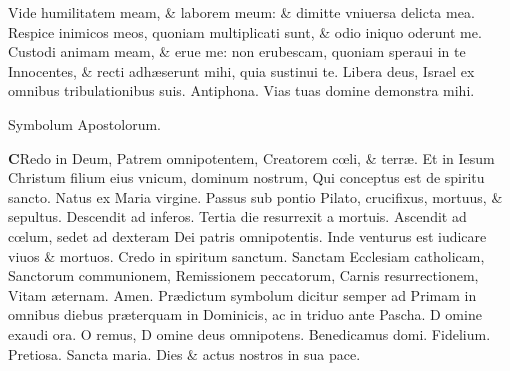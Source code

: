 \documentclass[a5paper,10pt]{book}
\def\ae{æ}
\def\oe{œ}
\begin{document}
\begin{multicols*}{2}
\newline \color{red} V\color{black}ide humilitatem meam, \& laborem meum: \& dimitte vniuersa delicta mea.
\newline \color{red} R\color{black}espice inimicos meos, quoniam multiplicati sunt, \& odio iniquo oderunt me.
\newline \color{red} C\color{black}ustodi animam meam, \& erue me: non erubescam, quoniam speraui in te%
\newline \color{red} I\color{black}nnocentes, \& recti adh\ae serunt mihi, quia sustinui te.
\newline \color{red} L\color{black}ibera deus, Israel ex omnibus tribulationibus suis. \quad \color{red} Antiphona. \color{black} Vias tuas domine demonstra mihi. \color{black}
\vspace{-1em}
\begin{center} \color{red}
Symbolum Apostolorum.
\end{center}
\vspace{-1em}
\lettrine[lines=2]{\bfseries \color{red} C}{}Redo in Deum, 
\color{red} P\color{black}atrem omnipotentem,
\color{red} C\color{black}reatorem c\oe li, \& terr\ae .
\color{red} E\color{black}t in Iesum Christum filium eius vnicum, dominum nostrum,
\color{red} Q\color{black}ui conceptus est de spiritu sancto.
\color{red} N\color{black}atus ex Maria virgine.
\color{red} P\color{black}assus sub pontio Pilato, crucifixus, mortuus, \& sepultus.
\color{red} D\color{black}escendit ad inferos.
\color{red} T\color{black}ertia die resurrexit a mortuis.
\color{red} A\color{black}scendit ad c\oe lum, sedet ad dexteram Dei patris omnipotentis.
\color{red} I\color{black}nde venturus est iudicare viuos \& mortuos.
\newline \color{red} C\color{black}redo in spiritum sanctum.
\newline \color{red} S\color{black}anctam Ecclesiam catholicam,
\newline \color{red} S\color{black}anctorum communionem,
\newline \color{red} R\color{black}emissionem peccatorum,
\newline \color{red} C\color{black}arnis resurrectionem,
\newline \color{red} V\color{black}itam \ae ternam. Amen.
\newline {} \color{red} Pr\ae dictum symbolum dicitur semper ad Primam in omnibus diebus pr\ae terquam in Dominicis, ac in triduo ante Pascha. \color{black}
\newline \color{red} D\color{black} omine exaudi ora. \color{red} O\color{black} remus, \color{red} D\color{black} omine deus omnipotens. Benedicamus domi. Fidelium. Pretiosa. Sancta maria. Dies \& actus nostros in sua pace.

\end{multicols*}
\end{document}
